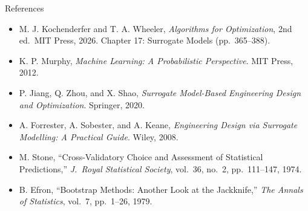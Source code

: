 \documentclass[aspectratio=169,10pt]{beamer}
\begin{document}
\begin{frame}{References}
  \begin{itemize}
    \item M. J. Kochenderfer and T. A. Wheeler,
          \emph{Algorithms for Optimization}, 2nd ed.\ MIT Press, 2026.
          Chapter 17: Surrogate Models (pp.\ 365--388).
    \item K. P. Murphy, \emph{Machine Learning: A Probabilistic Perspective}.
          MIT Press, 2012.
    \item P. Jiang, Q. Zhou, and X. Shao,
          \emph{Surrogate Model-Based Engineering Design and Optimization}.
          Springer, 2020.
    \item A. Forrester, A. Sobester, and A. Keane,
          \emph{Engineering Design via Surrogate Modelling: A Practical Guide}.
          Wiley, 2008.
    \item M. Stone, ``Cross-Validatory Choice and Assessment of Statistical Predictions,''
          \emph{J.\ Royal Statistical Society}, vol.\ 36, no.\ 2, pp.\ 111--147, 1974.
    \item B. Efron, ``Bootstrap Methods: Another Look at the Jackknife,''
          \emph{The Annals of Statistics}, vol.\ 7, pp.\ 1--26, 1979.
  \end{itemize}
\end{frame}
\end{document}
